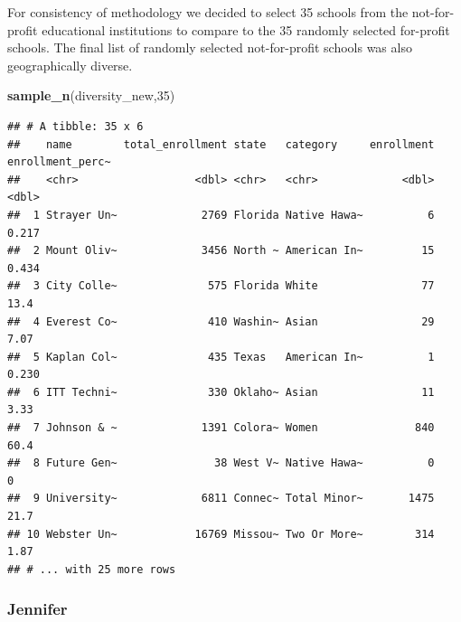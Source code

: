 \documentclass[
]{article}
\newenvironment{Shaded}{\begin{snugshade}}{\end{snugshade}}
\newcommand{\DecValTok}[1]{\textcolor[rgb]{0.00,0.00,0.81}{#1}}
\newcommand{\KeywordTok}[1]{\textcolor[rgb]{0.13,0.29,0.53}{\textbf{#1}}}
\newcommand{\NormalTok}[1]{#1}
\begin{document}
For consistency of methodology we decided to select 35 schools from the
not-for-profit educational institutions to compare to the 35 randomly
selected for-profit schools. The final list of randomly selected
not-for-profit schools was also geographically diverse.

\begin{Shaded}
\begin{Highlighting}[]
\KeywordTok{sample_n}\NormalTok{(diversity_new,}\DecValTok{35}\NormalTok{)}
\end{Highlighting}
\end{Shaded}

\begin{verbatim}
## # A tibble: 35 x 6
##    name        total_enrollment state   category     enrollment enrollment_perc~
##    <chr>                  <dbl> <chr>   <chr>             <dbl>            <dbl>
##  1 Strayer Un~             2769 Florida Native Hawa~          6            0.217
##  2 Mount Oliv~             3456 North ~ American In~         15            0.434
##  3 City Colle~              575 Florida White                77           13.4  
##  4 Everest Co~              410 Washin~ Asian                29            7.07 
##  5 Kaplan Col~              435 Texas   American In~          1            0.230
##  6 ITT Techni~              330 Oklaho~ Asian                11            3.33 
##  7 Johnson & ~             1391 Colora~ Women               840           60.4  
##  8 Future Gen~               38 West V~ Native Hawa~          0            0    
##  9 University~             6811 Connec~ Total Minor~       1475           21.7  
## 10 Webster Un~            16769 Missou~ Two Or More~        314            1.87 
## # ... with 25 more rows
\end{verbatim}

\hypertarget{jennifer-1}{%
\subsubsection{Jennifer}\label{jennifer-1}}
\end{document}
